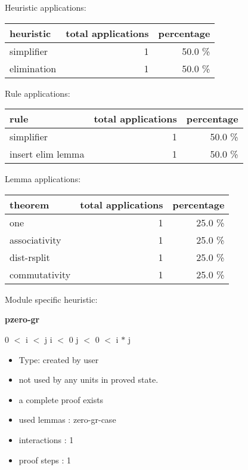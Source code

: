 \documentclass[a4paper]{article}
\begin{document}
\medskip


Heuristic applications:

\begin{supertabular}{l|r|r}
heuristic	& total applications & percentage \\ \hline
simplifier & 1 & 50.0 \% \\
elimination & 1 & 50.0 \% \\

\end{supertabular}

Rule applications:

\begin{supertabular}{l|r|r}
rule	        & total applications & percentage \\ \hline
simplifier & 1 & 50.0 \% \\
insert elim lemma & 1 & 50.0 \% \\

\end{supertabular}

Lemma applications:

\begin{supertabular}{l|r|r}
theorem	        & total applications & percentage \\ \hline
one & 1 & 25.0 \% \\
associativity & 1 & 25.0 \% \\
dist-rsplit & 1 & 25.0 \% \\
commutativity & 1 & 25.0 \% \\

\end{supertabular}

Module specific heuristic:

\pagebreak

{\LARGE\bf pzero-gr}\label{lemma-pzero-gr}

\medskip

0 $<$ i  $<$ j \Or i $<$ 0 \And j $<$ 0  $<$ i $*$ j

\begin{itemize}

\item Type: created by user

\item not used by any units in proved state.
\item       a complete proof exists
\item       used lemmas  : zero-gr-case
\item       interactions : 1
\item       proof steps  : 1
\end{itemize}
\end{document}
